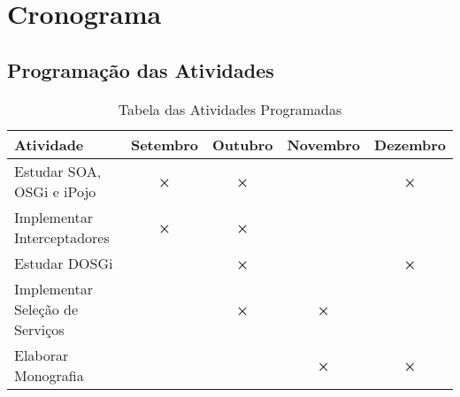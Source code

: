 \newpage
\chapter{Cronograma}
\label{pr:chrono}

\section{Programaç\~ao das Atividades}
{%
\begin{center}
\begin{table*}[h]
\begin{supertabular}[]{|l|c|c|c|c|}\hline
\textbf{Atividade} & \textbf{Setembro} & \textbf{Outubro} & \textbf{Novembro} & \textbf{Dezembro}\\\hline
Estudar SOA, OSGi e iPojo& \textbf{×} & \textbf{×} &   & \textbf{×}\\\hline
Implementar Interceptadores & \textbf{×} & \textbf{×} &  & \\\hline
Estudar DOSGi &   & \textbf{×} &   & \textbf{×}\\\hline
Implementar Seleção de Serviços &   & \textbf{×} & \textbf{×} &  \\\hline
Elaborar Monografia &   &   & \textbf{×} & \textbf{×}\\\hline
\end{supertabular}
\caption{Tabela das Atividades Programadas}
\end{table*}
\end{center}
}%


